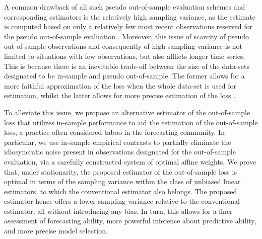 \documentclass[11pt,dvipsnames]{article}
\begin{document}
A common drawback of all such pseudo out-of-sample evaluation schemes and corresponding estimators is the relatively high sampling variance, as the estimate is computed based on only a relatively few most recent observations reserved for the pseudo out-of-sample evaluation \citep[][]{bergmeirUseCrossvalidationTime2012,bergmeirUsefulnessCrossvalidationDirectional2014,schnaubeltComparisonMachineLearning2019,cerqueiraEvaluatingTimeSeries2020}. Moreover, this issue of scarcity of pseudo out-of-sample observations and consequently of high sampling variance is not limited to situations with few observations, but also afflicts longer time series. This is because there is an inevitable trade-off between the size of the data-sets designated to be in-sample and pseudo out-of-sample. The former allows for a more faithful approximation of the loss when the whole data-set is used for estimation, whilst the latter allows for more precise estimation of the loss \citep[see][]{arlotSurveyCrossvalidationProcedures2010}. 

To alleviate this issue, we propose an alternative estimator of the out-of-sample loss that utilizes in-sample performance to aid the estimation of the out-of-sample loss, a practice often considered taboo in the forecasting community. In particular, we use in-sample empirical contrasts to partially eliminate the idiosyncratic noise present in observations designated for the out-of-sample evaluation, via a carefully constructed system of optimal affine weights. We prove that, under stationarity, the proposed estimator of the out-of-sample loss is optimal in terms of the sampling variance within the class of unbiased linear estimators, to which the conventional estimator also belongs. The proposed estimator hence offers a lower sampling variance relative to the conventional estimator, all without introducing any bias. In turn, this allows for a finer assessment of forecasting ability, more powerful inference about predictive ability, and more precise model selection.
\end{document}
